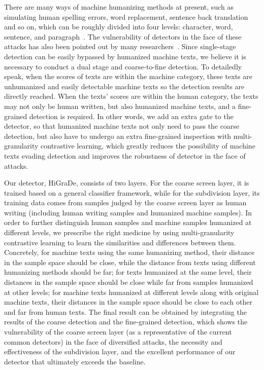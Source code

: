 \documentclass[11pt]{article}
\newcommand{\greenCitep}[1]{\textcolor{darkgreen}{\citep{#1}}}
\begin{document}
	There are many ways of machine humanizing methods at present, such as simulating human spelling errors, word replacement, sentence back translation and so on, which can be roughly divided into four levels: character, word, sentence, and paragraph~\greenCitep{zhou2024navigatingshadows}. The vulnerability of detectors in the face of these attacks has also been pointed out by many researchers~\greenCitep{dugan2024raid,krishna2024paraphrasing}. Since single-stage detection can be easily bypassed by humanized machine texts, we believe it is necessary to conduct a dual stage and coarse-to-fine detection. To detailedly speak, when the scores of texts are within the machine category, these texts are unhumanized and easily detectable machine texts so the detection results are directly reached. When the texts' scores are within the human category, the texts may not only be human written, but also humanized machine texts, and a fine-grained detection is required. In other words, we add an extra gate to the detector, so that humanized machine texts not only need to pass the coarse detection, but also have to undergo an extra fine-grained inspection with multi-granularity contrastive learning, which greatly reduces the possibility of machine texts evading detection and improves the robustness of detector in the face of attacks.

	Our detector, HiGraDe, consists of two layers. For the coarse screen layer, it is trained based on a general classifier framework, while for the subdivision layer, its training data comes from samples judged by the coarse screen layer as human writing (including human writing samples and humanized machine samples). In order to further distinguish human samples and machine samples humanized at different levels, we prescribe the right medicine by using multi-granularity contrastive learning to learn the similarities and differences between them. Concretely, for machine texts using the same humanizing method, their distance in the sample space should be close, while the distance from texts using different humanizing methods should be far; for texts humanized at the same level, their distances in the sample space should be close while far from samples humanized at other levels; for machine texts humanized at different levels along with original machine texts, their distances in the sample space should be close to each other and far from human texts. The final result can be obtained by integrating the results of the coarse detection and the fine-grained detection, which shows the vulnerability of the coarse screen layer (as a representative of the current common detectors) in the face of diversified attacks, the necessity and effectiveness of the subdivision layer, and the excellent performance of our detector that ultimately exceeds the baseline.
	
\end{document}

